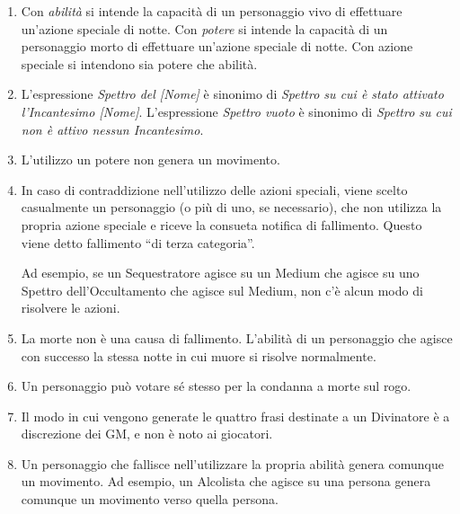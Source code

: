 \documentclass[a4paper,10pt]{article}
\begin{document}
\begin{enumerate}
	
	\item Con \emph{abilità} si intende la capacità di un personaggio vivo di effettuare un'azione speciale di notte. Con \emph{potere} si intende la capacità di un personaggio morto di effettuare un'azione speciale di notte. Con azione speciale si intendono sia potere che abilità.
	
	\item L'espressione \emph{Spettro del [Nome]} è sinonimo di \emph{Spettro su cui è stato attivato l'Incantesimo [Nome]}. L'espressione \emph{Spettro vuoto} è sinonimo di \emph{Spettro su cui non è attivo nessun Incantesimo}.

	\item L'utilizzo un potere non genera un movimento.
	
	\item In caso di contraddizione nell'utilizzo delle azioni speciali, viene scelto casualmente un personaggio (o più di uno, se necessario), che non utilizza la propria azione speciale e riceve la consueta notifica di fallimento. Questo viene detto fallimento ``di terza categoria''.
 
	Ad esempio, se un Sequestratore agisce su un Medium che agisce su uno Spettro dell'Occultamento che agisce sul Medium, non c'è alcun modo di risolvere le azioni.
	
	\item La morte non è una causa di fallimento. L'abilità di un personaggio che agisce con successo la stessa notte in cui muore si risolve normalmente. 
	
	\item Un personaggio può votare sé stesso per la condanna a morte sul rogo.
	
	\item Il modo in cui vengono generate le quattro frasi destinate a un Divinatore è a discrezione dei GM, e non è noto ai giocatori.
	
	\item Un personaggio che fallisce nell'utilizzare la propria abilità genera comunque un movimento.
	Ad esempio, un Alcolista che agisce su una persona genera comunque un movimento verso quella persona.
	

\end{enumerate}
\end{document}
